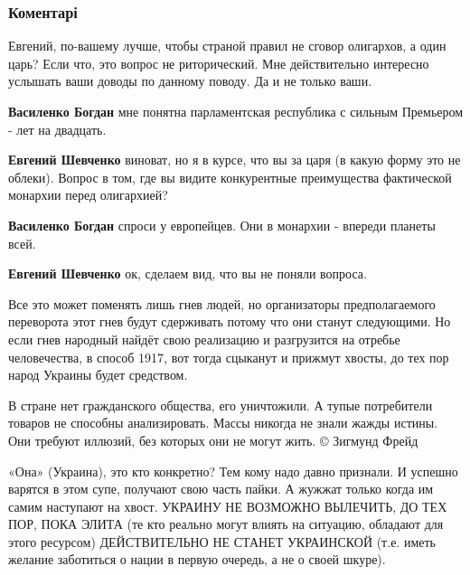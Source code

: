  
 
 
 
 
\subsubsection{Коментарі}
\label{sec:06_11_2021.fb.shevchenko_evgenij.1.ukraincy_glaza_um.cmt}

\begin{itemize} %
Евгений, по-вашему лучше, чтобы страной правил не сговор олигархов, а один царь?
Если что, это вопрос не риторический. Мне действительно интересно услышать ваши доводы по данному поводу.
Да и не только ваши.

\begin{itemize} %
\textbf{Василенко Богдан} мне понятна парламентская республика с сильным Премьером - лет на двадцать.

\textbf{Евгений Шевченко} виноват, но я в курсе, что вы за царя (в какую форму это не облеки).
Вопрос в том, где вы видите конкурентные преимущества фактической монархии перед олигархией?


\textbf{Василенко Богдан} спроси у европейцев. Они в монархии - впереди планеты всей.

\textbf{Евгений Шевченко} ок, сделаем вид, что вы не поняли вопроса.
\end{itemize} %


Все это может поменять лишь гнев людей, но организаторы предполагаемого
переворота этот гнев будут сдерживать потому что они станут следующими. Но если
гнев народный найдёт свою реализацию и разгрузится на отребье человечества, в
способ 1917, вот тогда сцыканут и прижмут хвосты, до тех пор народ Украины
будет средством.


В стране нет гражданского общества, его уничтожили. А тупые потребители товаров не способны анализировать.
Массы никогда не знали жажды истины. Они требуют иллюзий, без которых они не могут жить.
©️ Зигмунд Фрейд

«Она» (Украина), это кто конкретно?
Тем кому надо давно признали. И успешно варятся в этом супе, получают свою часть пайки. А жужжат только когда им самим наступают на хвост.
УКРАИНУ НЕ ВОЗМОЖНО ВЫЛЕЧИТЬ, ДО ТЕХ ПОР, ПОКА ЭЛИТА (те кто реально могут влиять на ситуацию, обладают для этого ресурсом) ДЕЙСТВИТЕЛЬНО НЕ СТАНЕТ УКРАИНСКОЙ (т.е. иметь желание заботиться о нации в первую очередь, а не о своей шкуре).


\end{itemize}
